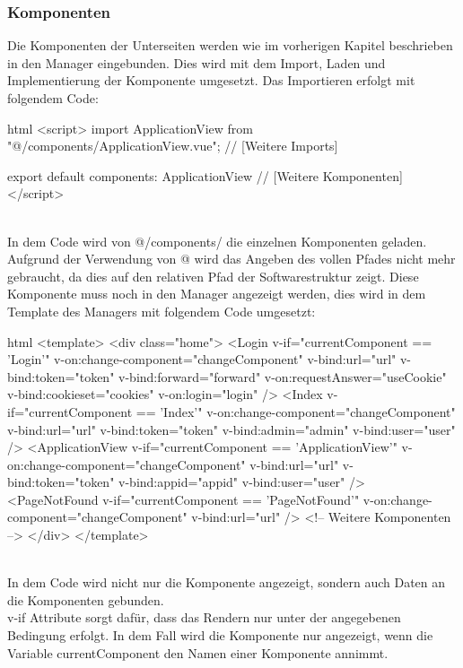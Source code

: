 \subsubsection{Komponenten}
Die Komponenten der Unterseiten werden wie im vorherigen Kapitel beschrieben in den Manager eingebunden. Dies wird mit dem Import, Laden und Implementierung der Komponente umgesetzt.
Das Importieren erfolgt mit folgendem Code:
\begin{code}{html}
	<script>
	import ApplicationView from "@/components/ApplicationView.vue";
	// [Weitere Imports]
	
	export default {
		components: {
			ApplicationView
			// [Weitere Komponenten]
		}
	}
</script>
\end{code}
~\\
In dem Code wird von @/components/ die einzelnen Komponenten geladen. Aufgrund der Verwendung von @ wird das Angeben des vollen Pfades nicht mehr gebraucht, da dies auf den relativen Pfad der Softwarestruktur zeigt.
\newpage
Diese Komponente muss noch in den Manager angezeigt werden, dies wird in dem Template des Managers mit folgendem Code umgesetzt:
\begin{code}{html}
<template>
	<div class="home">
		<Login
			v-if="currentComponent == 'Login'"
			v-on:change-component="changeComponent"
			v-bind:url="url"
			v-bind:token="token"
			v-bind:forward="forward"
			v-on:requestAnswer="useCookie"
			v-bind:cookieset="cookies"
			v-on:login="login"
		/>
		<Index
			v-if="currentComponent == 'Index'"
			v-on:change-component="changeComponent"
			v-bind:url="url"
			v-bind:token="token"
			v-bind:admin="admin"
			v-bind:user="user"
		/>
		<ApplicationView
			v-if="currentComponent == 'ApplicationView'"
			v-on:change-component="changeComponent"
			v-bind:url="url"
			v-bind:token="token"
			v-bind:appid="appid"
			v-bind:user="user"
		/>
		<PageNotFound
			v-if="currentComponent == 'PageNotFound'"
			v-on:change-component="changeComponent"
			v-bind:url="url"
		/>
		<!-- Weitere Komponenten -->
	</div>
</template>
\end{code}
~\\
In dem Code wird nicht nur die Komponente angezeigt, sondern auch Daten an die Komponenten gebunden.\\
v-if Attribute sorgt dafür, dass das Rendern nur unter der angegebenen Bedingung erfolgt. In dem Fall wird die Komponente nur angezeigt, wenn die Variable currentComponent den Namen einer Komponente annimmt.\\
